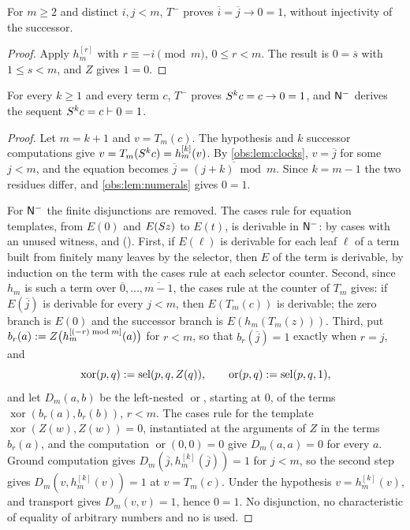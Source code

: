 \begin{lemma}
\label{obs:lem:numerals}
For $m\ge 2$ and distinct $i,j<m$, $T^{-}$ proves
$\overline{i}=\overline{j}\to 0=1$, without injectivity of the successor.
\end{lemma}

\begin{proof}
Apply $h_m^{[r]}$ with $r\equiv -i\pmod m$, $0\le r<m$. The result is
$0=\overline{s}$ with $1\le s<m$, and $Z$ gives $1=0$.
\end{proof}

\begin{theorem}
\label{obs:thm:no-cycle}
For every $k\ge 1$ and every term $c$, $T^{-}$ proves
$S^{k}c=c\to 0=1$, and $\mathsf{N}^{-}$ derives the sequent
$S^{k}c=c\vdash 0=1$.
\end{theorem}

\begin{proof}
Let $m=k+1$ and $v=T_m(c)$. The hypothesis and $k$ successor computations give
$v=T_m(S^{k}c)=h_m^{[k]}(v)$. By \cref{obs:lem:clocks}, $v=\overline{j}$ for
some $j<m$, and the equation becomes
$\overline{j}=\overline{(j+k)\bmod m}$. Since $k=m-1$ the two residues differ,
and \cref{obs:lem:numerals} gives $0=1$.

For $\mathsf{N}^{-}$ the finite disjunctions are removed. The cases rule for equation
templates, from $E(0)$ and $E(S z)$ to $E(t)$, is derivable in $\mathsf{N}^{-}$:
 by cases with an unused witness,  and 
(). First, if $E(\ell)$ is derivable for each leaf $\ell$ of
a term built from finitely many leaves by the selector, then $E$ of the term is
derivable, by induction on the term with the cases rule at each selector
counter. Second, since $h_m$ is such a term over
$\overline{0},\dots,\overline{m-1}$, the cases rule at the counter of $T_m$
gives: if $E(\overline{j})$ is derivable for every $j<m$, then $E(T_m(c))$ is
derivable; the zero branch is $E(0)$ and the successor branch is
$E(h_m(T_m(z)))$. Third, put
$b_r(a)\mathrel{:=} Z\bigl(h_m^{[(-r)\bmod m]}(a)\bigr)$ for $r<m$, so that
$b_r(\overline{j})=1$ exactly when $r=j$, and
\[
\operatorname{xor}(p,q)\mathrel{:=}\operatorname{sel}(p,q,Z(q)),\qquad
\operatorname{or}(p,q)\mathrel{:=}\operatorname{sel}(p,q,1),
\]
and let $D_m(a,b)$ be the left-nested $\operatorname{or}$, starting at $0$, of
the terms $\operatorname{xor}(b_r(a),b_r(b))$, $r<m$. The cases rule for the
template $\operatorname{xor}(Z(w),Z(w))=0$, instantiated at the arguments of
$Z$ in the terms $b_r(a)$, and the computation $\operatorname{or}(0,0)=0$ give
$D_m(a,a)=0$ for every $a$.
Ground computation gives
$D_m(\overline{j},h_m^{[k]}(\overline{j}))=1$ for $j<m$, so the second step
gives $D_m(v,h_m^{[k]}(v))=1$ at $v=T_m(c)$. Under the hypothesis
$v=h_m^{[k]}(v)$, and transport gives $D_m(v,v)=1$, hence $0=1$. No
disjunction, no characteristic of equality of arbitrary numbers and no
 is used.
\end{proof}

